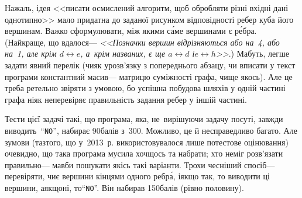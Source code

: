 На\nolinebreak[3] жаль, ідея <<писати осмислений алгоритм, щоб обробляти різні вхідні дані однотипно>> мало придатна до заданої рисунком відповідності ребер куба його вершинам. 
Важко сформулювати, між якими с\'{а}ме вершинами є р\'{е}бра. 
(Найкраще, що вдалося\nolinebreak[3] --- %
\textsl{<<Позначки вершин відрізняються або на~4, або на~1, але крім $d{\leftrightarrow}e$, а~крім названих, є ще $a{\leftrightarrow}d$ і\nolinebreak[3] $e{\leftrightarrow}h$>>}.) Мабуть, легше задати явний перелік (чи\nolinebreak[3] як у\nolinebreak[3] розв'язку з попереднього абзацу, чи вписати у текст програми константний масив\nolinebreak[3] --- матрицю суміжності графа, чи\nolinebreak[2] ще якось). Але це треба ретельно звіряти з умовою, бо успішна побудова шляхів у одній частині графа ніяк не\nolinebreak[3] перевіряє правильність задання ребер у іншій частині. 

\label{text:log-cube-how-to-get-part-of-points-easily}
Тести цієї задачі такі, що програма, яка, не~вирішуючи задачу по\nolinebreak[3] суті, завжди виводить~``\texttt{NO}'', набирає 90\nolinebreak[3] балів з~300. Можливо, це й несправедливо багато. Але з\nolinebreak[3] умови (та\nolinebreak[2] з\nolinebreak[2] того, що у~2013~р. використовувалося лише потестове оцінювання) очевидно, що така програма мусила хоч\nolinebreak[2] щось та набрати; хто не\nolinebreak[3] міг розв'язати правильно\nolinebreak[3] --- мав\nolinebreak[3] би пошукати якісь такі варіанти.
Трохи чесніший спосіб\nolinebreak[3] --- перевіряти, чи\nolinebreak[3] є вершини кінцями одного ребр\'{а}, і\nolinebreak[3] якщо так, то виводити ці вершини, а\nolinebreak[3] якщо\nolinebreak[3] ні, то\nolinebreak[3] ``\texttt{NO}''. Він набирав 150\nolinebreak[3] балів (рівно половину).
